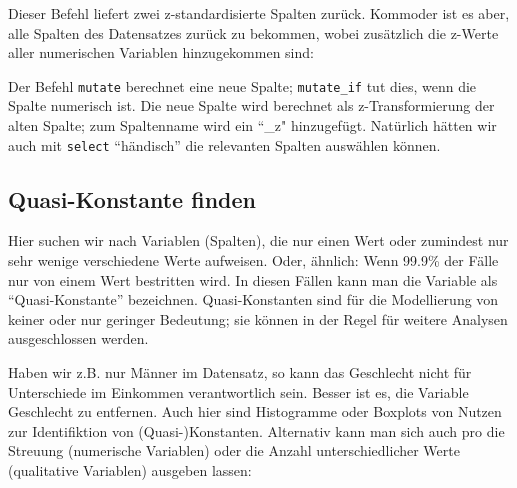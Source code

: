 \documentclass[12pt,ngerman,]{book}
\makeatletter
\newenvironment{Shaded}{\begin{snugshade}}{\end{snugshade}}
\newcommand{\KeywordTok}[1]{\textcolor[rgb]{0.13,0.29,0.53}{\textbf{{#1}}}}
\newcommand{\StringTok}[1]{\textcolor[rgb]{0.31,0.60,0.02}{{#1}}}
\newcommand{\CommentTok}[1]{\textcolor[rgb]{0.56,0.35,0.01}{\textit{{#1}}}}
\newcommand{\NormalTok}[1]{{#1}}
\newenvironment{kframe}{%
\medskip{}
\setlength{\fboxsep}{.8em}
 \def\at@end@of@kframe{}%
 \ifinner\ifhmode%
  \def\at@end@of@kframe{\end{minipage}}%
  \begin{minipage}{\columnwidth}%
 \fi\fi%
 \def\FrameCommand##1{\hskip\@totalleftmargin \hskip-\fboxsep
 \colorbox{shadecolor}{##1}\hskip-\fboxsep
     \hskip-\linewidth \hskip-\@totalleftmargin \hskip\columnwidth}%
 \MakeFramed {\advance\hsize-\width
   \@totalleftmargin\z@ \linewidth\hsize
   \@setminipage}}%
 {\par\unskip\endMakeFramed%
 \at@end@of@kframe}
\renewenvironment{Shaded}{\begin{kframe}}{\end{kframe}}
\makeatother
\begin{document}
Dieser Befehl liefert zwei z-standardisierte Spalten zurück. Kommoder
ist es aber, alle Spalten des Datensatzes zurück zu bekommen, wobei
zusätzlich die z-Werte aller numerischen Variablen hinzugekommen sind:

\begin{Shaded}
\end{Shaded}

Der Befehl \texttt{mutate} berechnet eine neue Spalte;
\texttt{mutate\_if} tut dies, wenn die Spalte numerisch ist. Die neue
Spalte wird berechnet als z-Transformierung der alten Spalte; zum
Spaltenname wird ein ``\_z" hinzugefügt. Natürlich hätten wir auch mit
\texttt{select} ``händisch'' die relevanten Spalten auswählen können.

\subsection{Quasi-Konstante finden}\label{quasi-konstante-finden}

Hier suchen wir nach Variablen (Spalten), die nur einen Wert oder
zumindest nur sehr wenige verschiedene Werte aufweisen. Oder, ähnlich:
Wenn 99.9\% der Fälle nur von einem Wert bestritten wird. In diesen
Fällen kann man die Variable als ``Quasi-Konstante'' bezeichnen.
Quasi-Konstanten sind für die Modellierung von keiner oder nur geringer
Bedeutung; sie können in der Regel für weitere Analysen ausgeschlossen
werden.

Haben wir z.B. nur Männer im Datensatz, so kann das Geschlecht nicht für
Unterschiede im Einkommen verantwortlich sein. Besser ist es, die
Variable Geschlecht zu entfernen. Auch hier sind Histogramme oder
Boxplots von Nutzen zur Identifiktion von (Quasi-)Konstanten. Alternativ
kann man sich auch pro die Streuung (numerische Variablen) oder die
Anzahl unterschiedlicher Werte (qualitative Variablen) ausgeben lassen:
\end{document}
